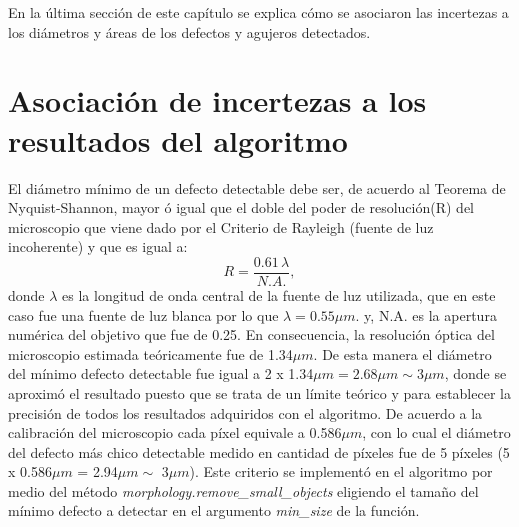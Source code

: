 En la última sección de este capítulo se explica cómo se asociaron las incertezas a los diámetros y áreas de los defectos y agujeros detectados.

\singlespacing
\section{Asociación de incertezas a los resultados del algoritmo}
\label{sec:incert}

\hspace{0.5cm} El diámetro mínimo de un defecto detectable debe ser, de acuerdo al Teorema de Nyquist-Shannon, mayor ó igual que el doble del poder de resolución(R) del microscopio que viene dado por el Criterio de Rayleigh (fuente de luz incoherente) y que es igual a:
\begin{equation}
R = \frac{0.61 \hspace{2pt} \lambda}{ N.A.},
\end{equation}
donde $\lambda$ es la longitud de onda central de la fuente de luz utilizada, que en este caso fue una fuente de luz blanca por lo que $\lambda = 0.55 \mu m$. y, N.A. es la apertura numérica del objetivo que fue de 0.25. En consecuencia, la resolución óptica del microscopio estimada teóricamente fue de 1.34$\mu m$. De esta manera el diámetro del mínimo defecto detectable fue igual a 2 x 1.34$\mu m = 2.68 \mu m \sim 3 \mu m$, donde se aproximó el resultado puesto que se trata de un límite teórico y para establecer la precisión de todos los resultados adquiridos con el algoritmo. De acuerdo a la calibración del microscopio cada píxel equivale a 0.586$\mu m$, con lo cual el diámetro del defecto más chico detectable medido en cantidad de píxeles fue de 5 píxeles (5 x 0.586$\mu m$ = 2.94$\mu m \sim$ 3$\mu m$). Este criterio se implementó en el algoritmo por medio del método \textit{morphology.remove\_small\_objects} eligiendo el tamaño del mínimo defecto a detectar en el argumento \textit{min\_size} de la función.

